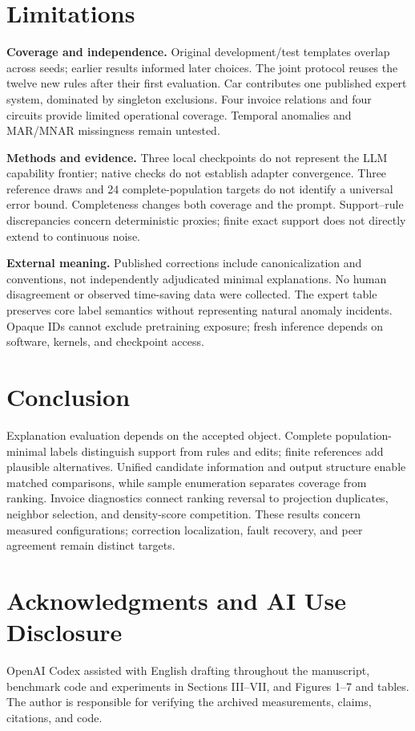 \documentclass[conference]{IEEEtran}
\begin{document}
\section{Limitations}
\textbf{Coverage and independence.} Original development/test templates overlap across seeds; earlier results informed later choices. The joint protocol reuses the twelve new rules after their first evaluation. Car contributes one published expert system, dominated by singleton exclusions. Four invoice relations and four circuits provide limited operational coverage. Temporal anomalies and MAR/MNAR missingness remain untested.

\textbf{Methods and evidence.} Three local checkpoints do not represent the LLM capability frontier; native checks do not establish adapter convergence. Three reference draws and 24 complete-population targets do not identify a universal error bound. Completeness changes both coverage and the prompt. Support--rule discrepancies concern deterministic proxies; finite exact support does not directly extend to continuous noise.

\textbf{External meaning.} Published corrections include canonicalization and conventions, not independently adjudicated minimal explanations. No human disagreement or observed time-saving data were collected. The expert table preserves core label semantics without representing natural anomaly incidents. Opaque IDs cannot exclude pretraining exposure; fresh inference depends on software, kernels, and checkpoint access.

\section{Conclusion}
Explanation evaluation depends on the accepted object. Complete population-minimal labels distinguish support from rules and edits; finite references add plausible alternatives. Unified candidate information and output structure enable matched comparisons, while sample enumeration separates coverage from ranking. Invoice diagnostics connect ranking reversal to projection duplicates, neighbor selection, and density-score competition. These results concern measured configurations; correction localization, fault recovery, and peer agreement remain distinct targets.

\label{page:main-end}
\clearpage
\section*{Acknowledgments and AI Use Disclosure}
OpenAI Codex assisted with English drafting throughout the manuscript, benchmark code and experiments in Sections III--VII, and Figures 1--7 and tables. The author is responsible for verifying the archived measurements, claims, citations, and code.


\end{document}
